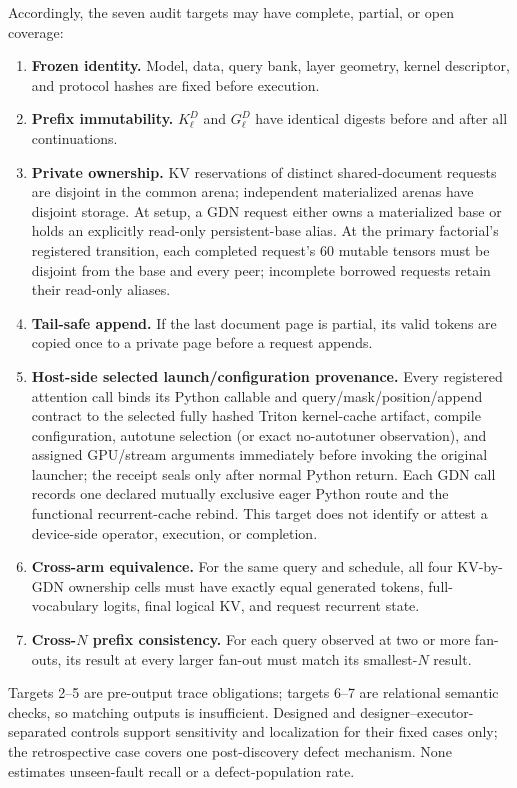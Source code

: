 \documentclass{article}
\begin{document}
Accordingly, the seven audit targets may have complete, partial, or open coverage:
\FloatBarrier
\begin{enumerate}
  \setlength{\itemsep}{1pt}
  \setlength{\parskip}{0pt}
  \item \textbf{Frozen identity.}  Model, data, query bank, layer geometry,
  kernel descriptor, and protocol hashes are fixed before execution.
  \item \textbf{Prefix immutability.}  $K^D_\ell$ and $G^D_\ell$ have identical
  digests before and after all continuations.
  \item \textbf{Private ownership.}  KV reservations of distinct
  shared-document requests are disjoint in the common arena; independent
  materialized arenas have disjoint storage.  At setup, a GDN request either
  owns a materialized base or holds an explicitly read-only persistent-base
  alias.  At the primary factorial's registered transition, each completed
  request's 60 mutable tensors must be disjoint from the base and every peer;
  incomplete borrowed requests retain their read-only aliases.
  \item \textbf{Tail-safe append.}  If the last document page is partial, its
  valid tokens are copied once to a private page before a request appends.
  \item \textbf{Host-side selected launch/configuration provenance.}
  Every registered attention call binds its Python callable and
  query/mask/position/append contract to the selected fully hashed Triton
  kernel-cache artifact, compile configuration, autotune selection (or exact
  no-autotuner observation), and assigned GPU/stream arguments immediately
  before invoking the original launcher; the receipt seals only after normal
  Python return.  Each GDN call records one declared mutually exclusive eager
  Python route and the functional recurrent-cache rebind.  This target does not
  identify or attest a device-side operator, execution, or completion.
  \item \textbf{Cross-arm equivalence.}  For the same query and schedule, all
  four KV-by-GDN ownership cells must have exactly equal generated
  tokens, full-vocabulary logits, final logical KV, and request recurrent
  state.
  \item \textbf{Cross-$N$ prefix consistency.}  For each query observed at two or more
  fan-outs, its result at every larger fan-out must match its smallest-$N$
  result.
\end{enumerate}

Targets 2--5 are pre-output trace obligations; targets 6--7 are relational
semantic checks, so matching outputs is insufficient.  Designed and
designer--executor-separated controls support sensitivity and localization for
their fixed cases only; the retrospective case covers one post-discovery defect
mechanism.  None estimates unseen-fault recall or a defect-population rate.
\end{document}
